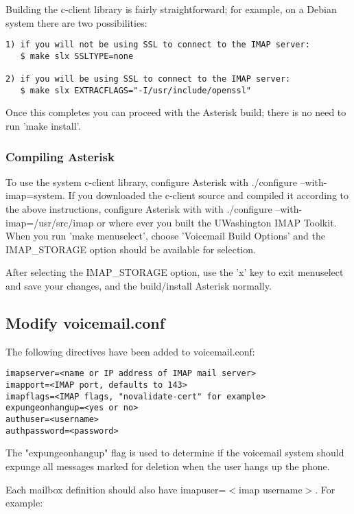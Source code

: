Building the c-client library is fairly straightforward; for example, on a
Debian system there are two possibilities:

\begin{verbatim}
1) if you will not be using SSL to connect to the IMAP server:
   $ make slx SSLTYPE=none

2) if you will be using SSL to connect to the IMAP server:
   $ make slx EXTRACFLAGS="-I/usr/include/openssl"
\end{verbatim}

Once this completes you can proceed with the Asterisk build; there is no
need to run 'make install'.

\subsubsection{Compiling Asterisk}

To use the system c-client library, configure Asterisk with
./configure --with-imap=system. If you downloaded the c-client source
and compiled it according to the above instructions, configure
Asterisk with with ./configure --with-imap=/usr/src/imap or where ever
you built the UWashington IMAP Toolkit. When you run 'make
menuselect', choose 'Voicemail Build Options' and the IMAP\_STORAGE
option should be available for selection.

After selecting the IMAP\_STORAGE option, use the 'x' key to exit
menuselect and save your changes, and the build/install Asterisk
normally.

\subsection{Modify voicemail.conf}

The following directives have been added to voicemail.conf:

\begin{verbatim}
imapserver=<name or IP address of IMAP mail server>
imapport=<IMAP port, defaults to 143>
imapflags=<IMAP flags, "novalidate-cert" for example>
expungeonhangup=<yes or no>
authuser=<username>
authpassword=<password>
\end{verbatim}

The "expungeonhangup" flag is used to determine if the voicemail system should
expunge all messages marked for deletion when the user hangs up the phone. 

Each mailbox definition should also have imapuser=$<$imap username$>$.
For example:

